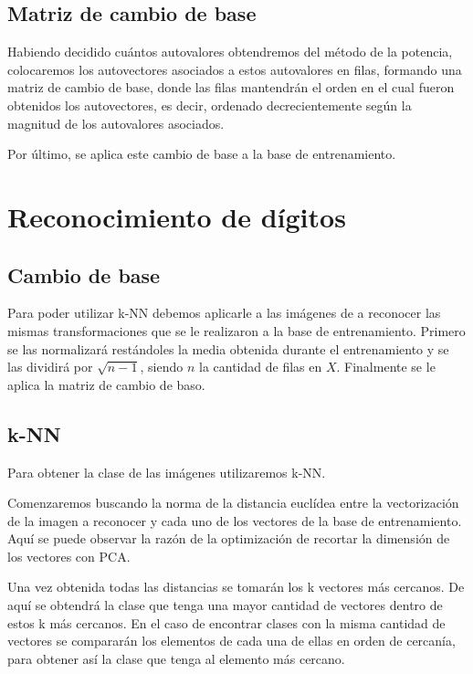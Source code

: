 \subsection{Matriz de cambio de base}

Habiendo decidido cuántos autovalores obtendremos del método de la potencia, colocaremos los autovectores asociados a estos autovalores en filas, formando una matriz de cambio de base, donde las filas mantendrán el orden en el cual fueron obtenidos los autovectores, es decir, ordenado decrecientemente según la magnitud de los autovalores asociados.

Por último, se aplica este cambio de base a la base de entrenamiento.


\section{Reconocimiento de dígitos}

\subsection{Cambio de base}

Para poder utilizar k-NN debemos aplicarle a las imágenes de a reconocer las mismas transformaciones que se le realizaron a la base de entrenamiento. Primero se las normalizará restándoles la media obtenida durante el entrenamiento y se las dividirá por $\sqrt{n - 1}$, siendo $n$ la cantidad de filas en $X$. Finalmente se le aplica la matriz de cambio de baso.

\subsection{k-NN}

Para obtener la clase de las imágenes utilizaremos k-NN.

Comenzaremos buscando la norma de la distancia euclídea entre la vectorización de la imagen a reconocer y cada uno de los vectores de la base de entrenamiento. Aquí se puede observar la razón de la optimización de recortar la dimensión de los vectores con PCA.

Una vez obtenida todas las distancias se tomarán los k vectores más cercanos. De aquí se obtendrá la clase que tenga una mayor cantidad de vectores dentro de estos k más cercanos. En el caso de encontrar clases con la misma cantidad de vectores se compararán los elementos de cada una de ellas en orden de cercanía, para obtener así la clase que tenga al elemento más cercano.